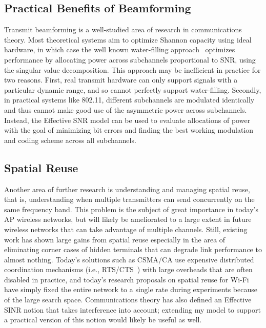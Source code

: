 \subsection{Practical Benefits of Beamforming}
Transmit beamforming is a well-studied area of research in communications theory. Most theoretical systems aim to optimize Shannon capacity using ideal hardware, in which case the well known water-filling approach~\cite[p. 183]{Tse} optimizes performance by allocating power across subchannels proportional to SNR, using the singular value decomposition. This approach may be inefficient in practice for two reasons. First, real transmit hardware can only support signals with a particular dynamic range, and so cannot perfectly support water-filling. Secondly, in practical systems like 802.11, different subchannels are modulated identically and thus cannot make good use of the asymmetric power across subchannels. Instead, the Effective SNR model can be used to evaluate allocations of power with the goal of minimizing bit errors and finding the best working modulation and coding scheme across all subchannels.

\subsection{Spatial Reuse}
Another area of further research is understanding and managing spatial reuse, that is, understanding when multiple transmitters can send concurrently on the same frequency band. This problem is the subject of great importance in today's AP wireless networks, but will likely be ameliorated to a large extent in future wireless networks that can take advantage of multiple channels. Still, existing work has shown large gains from spatial reuse especially in the area of eliminating corner cases of hidden terminals that can degrade link performance to almost nothing. Today's solutions such as CSMA/CA use expensive distributed coordination mechanisms (i.e., RTS/CTS~\cite{Karn_MACA}) with large overheads that are often disabled in practice, and today's research proposals on spatial reuse for Wi-Fi~\cite{Shrivastava_CENTAUR,Vutukuru_CMAP} have simply fixed the entire network to a single rate during experiments because of the large search space. Communications theory has also defined an Effective SINR notion that takes interference into account; extending my model to support a practical version of this notion would likely be useful as well.


